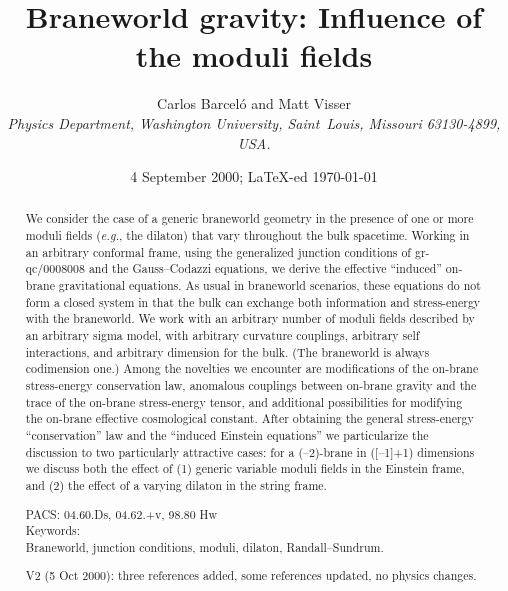 \documentclass[a4paper,10pt]{article}
\begin{document}
   
\def\Barcelo{Barcel\'o}
\title{\Large 
\bf Braneworld gravity: Influence of the moduli fields}
\author{Carlos {\Barcelo} and Matt Visser\\[2mm]
{\small \it 
Physics Department, Washington University, 
Saint~Louis, Missouri 63130-4899, USA.}}
\date{{\small 4 September 2000; \LaTeX-ed \today}}
\maketitle
\begin{abstract}
We consider the case of a generic braneworld geometry in the presence
of one or more moduli fields ({\emph{e.g.}}, the dilaton) that vary
throughout the bulk spacetime. Working in an arbitrary conformal
frame, using the generalized junction conditions of gr-qc/0008008 and
the Gauss--Codazzi equations, we derive the effective ``induced''
on-brane gravitational equations.  As usual in braneworld scenarios,
these equations do not form a closed system in that the bulk can
exchange both information and stress-energy with the braneworld.  We
work with an arbitrary number of moduli fields described by an
arbitrary sigma model, with arbitrary curvature couplings, arbitrary
self interactions, and arbitrary dimension for the bulk. (The
braneworld is always codimension one.) Among the novelties we
encounter are modifications of the on-brane stress-energy conservation
law, anomalous couplings between on-brane gravity and the trace of the
on-brane stress-energy tensor, and additional possibilities for
modifying the on-brane effective cosmological constant. After
obtaining the general stress-energy ``conservation'' law and the
``induced Einstein equations'' we particularize the discussion to two
particularly attractive cases: for a (\coordHE{}--2)-brane in ([\coordHE{}--1]+1)
dimensions we discuss both the effect of (1) generic variable moduli
fields in the Einstein frame, and (2) the effect of a varying dilaton
in the string frame.
\vspace*{5mm}

\noindent
PACS: 04.60.Ds, 04.62.+v, 98.80 Hw\\
Keywords: \\
Braneworld, junction conditions, moduli, dilaton, Randall--Sundrum.
\vspace*{5mm}

\noindent
V2 (5 Oct 2000): three references added, some references updated, no physics changes.
\end{abstract}
\end{document}
